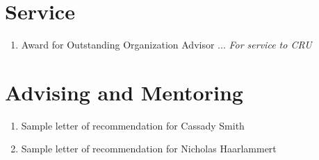\documentclass[../../main.tex]{subfiles}
\begin{document}
\section{Service}

\begin{enumerate}
\item Award for Outstanding Organization Advisor ... \textit{For service to CRU}
\end{enumerate}

\section{Advising and Mentoring}

\begin{enumerate}
\item Sample letter of recommendation for Cassady Smith
\item Sample letter of recommendation for Nicholas Haarlammert
\end{enumerate}
\end{document}
